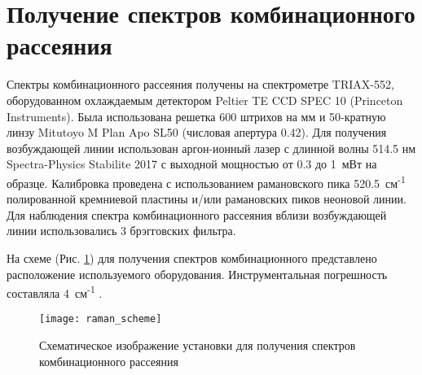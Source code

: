 \newpage
\section{Получение спектров комбинационного рассеяния} \label{sect2_6}

Спектры комбинационного рассеяния получены на спектрометре TRIAX-552, оборудованном охлаждаемым детектором Peltier TE CCD SPEC 10 (Princeton Instruments).
Была использована решетка 600 штрихов на мм и 50-кратную линзу Mitutoyo M Plan Apo SL50 (числовая апертура 0.42).
Для получения возбуждающей линии использован аргон-ионный лазер с длинной волны 514.5 нм Spectra-Physics Stabilite 2017 с выходной мощностью от 0.3 до 1~мВт на образце. Калибровка проведена с использованием рамановского пика 520.5~см\textsuperscript{-1} полированной кремниевой пластины и/или рамановских пиков неоновой линии. 
Для наблюдения спектра комбинационного рассеяния вблизи возбуждающей линии использовались 3  брэгговских фильтра.

На схеме (Рис. \ref{img:raman}) для получения спектров комбинационного представлено расположение используемого оборудования. Инструментальная погрешность составляла 4~см\textsuperscript{-1} .
\begin{figure}[p!]
  \begin{minipage}[ht]{0.99\linewidth}\centering
    \texttt{[image: raman\_scheme]} 
  \end{minipage}
  

      \caption[Схематическое изображение установки для получения спектров комбинационного рассеяния]{Схематическое изображение установки для получения спектров комбинационного рассеяния}
    \label{img:raman}
\end{figure}